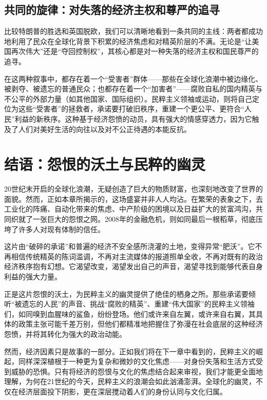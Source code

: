 \subsection{共同的旋律：对失落的经济主权和尊严的追寻}

比较特朗普的胜选和英国脱欧，我们可以清晰地看到一条共同的主线：两者都成功地利用了民众在全球化背景下积累的经济焦虑和对精英阶层的不满。无论是“让美国再次伟大”还是“夺回控制权”，其核心都是对一种失落的经济主权和国民尊严的追寻。

在这两种叙事中，都存在着一个“受害者”群体——那些在全球化浪潮中被边缘化、被剥夺、被遗忘的普通民众；也都存在着一个“加害者”——腐败自私的国内精英与不公平的外部力量（如其他国家、国际组织）。民粹主义领袖或运动，则将自己定位为这些“受害者”的拯救者，承诺要打破旧秩序，重建一个更公平、更符合“人民”利益的新秩序。这种基于经济怨愤的动员，具有强大的情感穿透力，因为它触及了人们对美好生活的向往以及对不公正待遇的本能反抗。

\section{结语：怨恨的沃土与民粹的幽灵}

20世纪末开启的全球化浪潮，无疑创造了巨大的物质财富，也深刻地改变了世界的面貌。然而，正如本章所揭示的，这场盛宴并非人人均沾。在繁荣的表象之下，去工业化的阵痛、自动化带来的焦虑、中产阶级的困境以及日益扩大的贫富鸿沟，共同织就了一张巨大的怨恨之网。2008年的金融危机，则如同最后一根稻草，彻底压垮了许多人对现有体制的信任。

这片由“破碎的承诺”和普遍的经济不安全感所浇灌的土地，变得异常“肥沃”。它不再相信传统精英的陈词滥调，不再对主流媒体的报道照单全收，不再对既有的政治经济秩序抱有幻想。它渴望改变，渴望发出自己的声音，渴望寻找到能够代表自身利益的强大力量。

正是这片怨恨的沃土，为民粹主义的幽灵提供了绝佳的栖身之所。那些承诺要倾听“被遗忘的人民”的声音、挑战“腐败的精英”、重建“伟大国家”的民粹主义领袖们，如同嗅到血腥味的鲨鱼，纷纷登场。他们或许来自左翼，或许来自右翼，其具体的政策主张可能千差万别，但他们都精准地把握住了弥漫在社会底层的这种经济怨愤，并将其转化为强大的政治动能。

然而，经济因素只是故事的一部分。正如我们将在下一章中看到的，民粹主义的崛起，同样深深植根于一种更为复杂和微妙的文化焦虑——对身份失落和生活方式受到威胁的恐惧。只有将经济的怨恨与文化的焦虑结合起来审视，我们才能更全面地理解，为何在21世纪的今天，民粹主义的浪潮会如此汹涌澎湃。全球化的幽灵，不仅在经济层面投下阴影，更在深层搅动着人们的身份认同与文化归属。